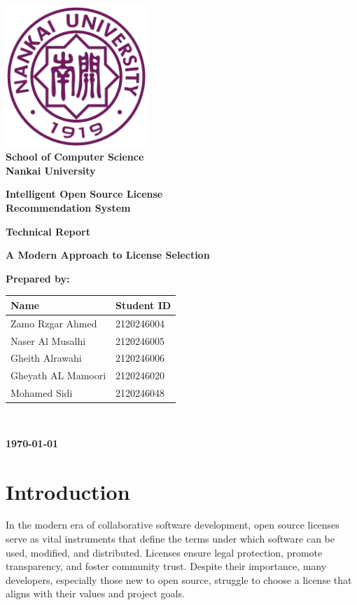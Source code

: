 \documentclass[12pt,a4paper]{report}
\begin{document}
\begin{titlepage}
    \centering
    \vspace*{-1cm}
    \includegraphics[width=0.4\textwidth]{nankai-logo.pdf}\\[1cm]
    {\large\bfseries School of Computer Science\\
    Nankai University\\[1cm]}

    {\Huge\bfseries Intelligent Open Source License\\Recommendation System\\[1.5cm]}

    {\Large\bfseries Technical Report\\[0.5cm]}

    {\large\bfseries A Modern Approach to License Selection}\\[2cm]

    {\Large\bfseries Prepared by:\\[0.5cm]
    \begin{tabular}{ll}
        Name               & Student ID \\
        \hline
        Zamo Rzgar Ahmed   & 2120246004 \\
        Naser Al Musalhi   & 2120246005 \\
        Gheith Alrawahi    & 2120246006 \\
        Gheyath AL Mamoori & 2120246020 \\
        Mohamed Sidi       & 2120246048 \\
    \end{tabular}\\[2cm]}

    {\large\bfseries \today}

\end{titlepage}

\tableofcontents
\newpage

\chapter{Introduction}
In the modern era of collaborative software development, open source licenses serve as vital instruments that define the terms under which software can be used, modified, and distributed. Licenses ensure legal protection, promote transparency, and foster community trust. Despite their importance, many developers, especially those new to open source, struggle to choose a license that aligns with their values and project goals.
\end{document}
